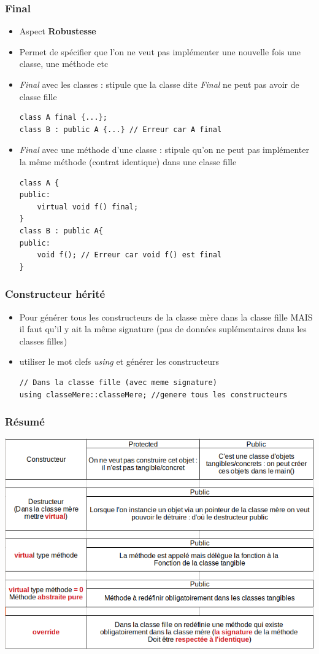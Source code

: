 \documentclass[12pt,a4paper]{article}
\begin{document}
\subsubsection{Final}
\begin{itemize}
\item Aspect \textbf{Robustesse}
\item Permet de spécifier que l'on ne veut pas implémenter une nouvelle fois une classe, une méthode etc
\item \textit{Final} avec les classes : stipule que la classe dite \textit{Final} ne peut pas avoir de classe fille
\begin{lstlisting}
class A final {...};
class B : public A {...} // Erreur car A final
\end{lstlisting}
\item \textit{Final} avec une méthode d'une classe : stipule qu'on ne peut pas implémenter la même méthode (contrat identique) dans une classe fille
\begin{lstlisting}
class A {
public:
	virtual void f() final;
}
class B : public A{
public:
	void f(); // Erreur car void f() est final
}
\end{lstlisting}
\end{itemize}
\subsubsection{Constructeur hérité}
\begin{itemize}
\item Pour générer tous les constructeurs de la classe mère dans la classe fille MAIS il faut qu'il y ait la même signature (pas de données suplémentaires dans les classes filles)
\item utiliser le mot clefs \textit{using} et générer les constructeurs
\begin{lstlisting}
// Dans la classe fille (avec meme signature)
using classeMere::classeMere; //genere tous les constructeurs
\end{lstlisting}
\end{itemize}
\subsubsection{Résumé}
\begin{center}
\includegraphics[scale=0.5]{resume}
\end{center}
\end{document}
